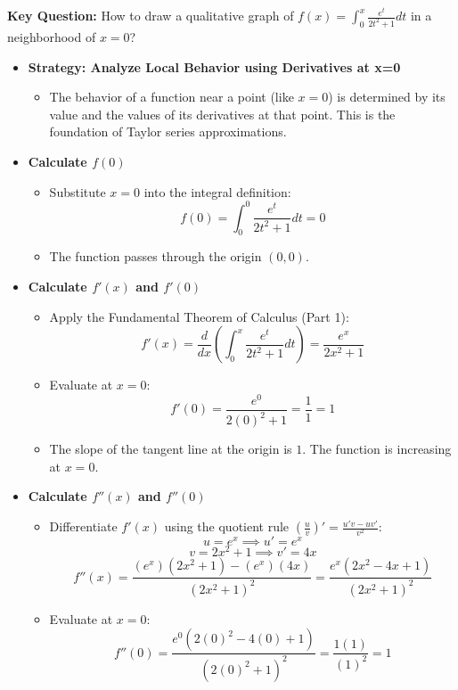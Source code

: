 \begin{cascade}[Qualitative Graph Sketching of Integral Functions near x=0]
	\textbf{Key Question:} How to draw a qualitative graph of $f(x) = \int_0^x \frac{e^t}{2t^2+1} dt$ in a neighborhood of $x=0$?
	\begin{itemize}
		\item \textbf{Strategy: Analyze Local Behavior using Derivatives at x=0}
		      \begin{itemize}
			      \item The behavior of a function near a point (like $x=0$) is determined by its value and the values of its derivatives at that point. This is the foundation of Taylor series approximations.
		      \end{itemize}
		\item \textbf{Calculate $f(0)$}
		      \begin{itemize}
			      \item Substitute $x=0$ into the integral definition:
			            \[ f(0) = \int_0^0 \frac{e^t}{2t^2+1} dt = 0 \]
			      \item The function passes through the origin $(0, 0)$.
		      \end{itemize}
		\item \textbf{Calculate $f'(x)$ and $f'(0)$}
		      \begin{itemize}
			      \item Apply the Fundamental Theorem of Calculus (Part 1):
			            \[ f'(x) = \frac{d}{dx} \left( \int_0^x \frac{e^t}{2t^2+1} dt \right) = \frac{e^x}{2x^2+1} \]
			      \item Evaluate at $x=0$:
			            \[ f'(0) = \frac{e^0}{2(0)^2+1} = \frac{1}{1} = 1 \]
			      \item The slope of the tangent line at the origin is $1$. The function is increasing at $x=0$.
		      \end{itemize}
		\item \textbf{Calculate $f''(x)$ and $f''(0)$}
		      \begin{itemize}
			      \item Differentiate $f'(x)$ using the quotient rule $\left(\frac{u}{v}\right)' = \frac{u'v - uv'}{v^2}$:
			            \[ u = e^x \implies u' = e^x \]
			            \[ v = 2x^2+1 \implies v' = 4x \]
			            \[ f''(x) = \frac{(e^x)(2x^2+1) - (e^x)(4x)}{(2x^2+1)^2} = \frac{e^x(2x^2 - 4x + 1)}{(2x^2+1)^2} \]
			      \item Evaluate at $x=0$:
			            \[ f''(0) = \frac{e^0(2(0)^2 - 4(0) + 1)}{(2(0)^2+1)^2} = \frac{1(1)}{(1)^2} = 1 \]

\end{itemize}
\end{itemize}
\end{cascade}

